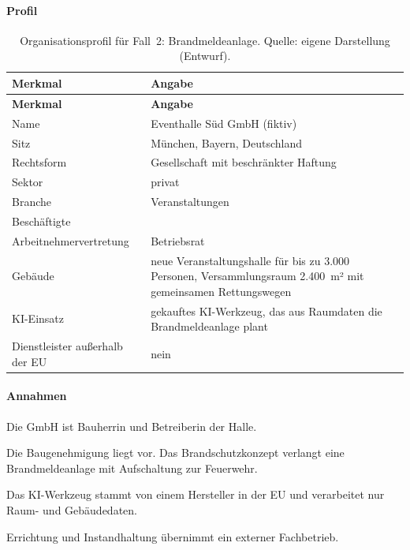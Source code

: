 \paragraph{Profil}
\begin{small}\begin{longtable}{@{}>{\raggedright\arraybackslash}p{5.0cm}>{\raggedright\arraybackslash}p{9.5cm}@{}}
\caption[Organisationsprofil für Fall~2]{Organisationsprofil für Fall~2: Brandmeldeanlage. Quelle: eigene Darstellung (Entwurf).}\label{tab:fall2_profil}\\
\toprule \textbf{Merkmal} & \textbf{Angabe} \\ \midrule \endfirsthead
\toprule \textbf{Merkmal} & \textbf{Angabe} \\ \midrule \endhead
\bottomrule \endfoot
Name & Eventhalle Süd GmbH (fiktiv) \\
Sitz & München, Bayern, Deutschland \\
Rechtsform & Gesellschaft mit beschränkter Haftung \\
Sektor & privat \\
Branche & Veranstaltungen \\
Beschäftigte & 80 \\
Arbeitnehmervertretung & Betriebsrat \\
Gebäude & neue Veranstaltungshalle für bis zu 3.000 Personen, Versammlungsraum 2.400~m² mit gemeinsamen Rettungswegen \\
KI-Einsatz & gekauftes KI-Werkzeug, das aus Raumdaten die Brandmeldeanlage plant \\
Dienstleister außerhalb der EU & nein \\
\end{longtable}\end{small}
\paragraph{Annahmen}
\begin{description}[leftmargin=1.0cm,style=sameline]
  \item[A1] Die GmbH ist Bauherrin und Betreiberin der Halle.
  \item[A2] Die Baugenehmigung liegt vor. Das Brandschutzkonzept verlangt eine Brandmeldeanlage mit Aufschaltung zur Feuerwehr.
  \item[A3] Das KI-Werkzeug stammt von einem Hersteller in der EU und verarbeitet nur Raum- und Gebäudedaten.
  \item[A4] Errichtung und Instandhaltung übernimmt ein externer Fachbetrieb.
\end{description}
